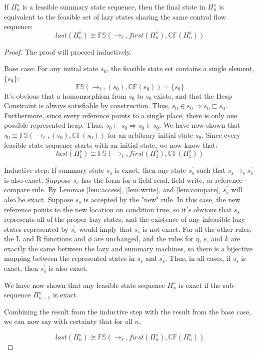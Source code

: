 \begin{theorem}
If $\Pi_n^s$ is a feasible summary state sequence, then the final state in $\Pi_n^s$ is equivalent to the feasible set of lazy states sharing the same control flow sequence:
\begin{equation}
\mathit{last}(\Pi_n^s) \cong \mathbb{FS}(\rightarrow_\ell, \mathit{first}(\Pi_n^s), \mathbb{CF}(\Pi_n^s) )
\end{equation}
\end{theorem}
\begin{proof}
The proof will proceed inductively.

Base case: For any initial state $s_0$, the feasible state set contains a single element, $\{s_0\}$:
$$\mathbb{FS}(\rightarrow_\ell, (s_0), \mathbb{CF}(s_0)) = \{s_0\}$$
It's obvious that a homomorphism from $s_0$ to $s_0$ exists, and that the Heap Constraint is always satisfiable by construction. Thus, $s_0 \in {s_0} \Rightarrow s_0 \sqsubset s_0$. 
Furthermore, since every reference points to a single place, there is only one possible represented heap. Thus, $s_0 \sqsubset s_0 \Rightarrow s_0 \in {s_0}$. We have now shown that $s_0 \cong \mathbb{FS}(\rightarrow_\ell, (s_0), \mathbb{CF}(s_0))$ for an arbitrary initial state $s_0$. Since every feasible state sequence starts with an initial state, we now know that:
 $$\mathit{last}(\Pi_1^s) \cong \mathbb{FS}(\rightarrow_\ell, \mathit{first}(\Pi_1^s), \mathbb{CF}(\Pi_1^s) ) $$

Inductive step: If summary state $s_s$ is exact, then any state $s_s^\prime$ such that $s_s \rightarrow_s s_s^\prime$ is also exact. Suppose $s_s $ has the form for a field read, field write, or reference compare rule. By Lemmas \ref{lem:access}, \ref{lem:write}, and \ref{lem:compare}, $s_s^\prime$ will also be exact.
Suppose $s_s$ is accepted by the "new" rule. In this case, the new reference points to the new location on condition true, so it's obvious that $s_s$ represents all of the proper lazy states, and the existence of any infeasible lazy states represented by $s_s^\prime$ would imply that $s_s$ is not exact.
For all the other rules, the L and R functions and $\phi$ are unchanged, and the rules for  $\eta$, $e$, and $k$ are exactly the same between the lazy and summary machines, so there is a bijective mapping between the represented states in $s_s$ and $s_s^\prime$.
Thus, in all cases, if $s_s$ is exact, then $s_s^\prime$ is also exact.

We have now shown that any feasible state sequence $\Pi_n^s$ is exact if the sub-sequence $\Pi_{n-1}^s$ is exact.

Combining the result from the inductive step with the result from the base case, we can now say with certainty that for all $n$,

$$\mathit{last}(\Pi_n^s) \cong \mathbb{FS}(\rightarrow_\ell, \mathit{first}(\Pi_n^s), \mathbb{CF}(\Pi_n^s) ) $$

\end{proof}

